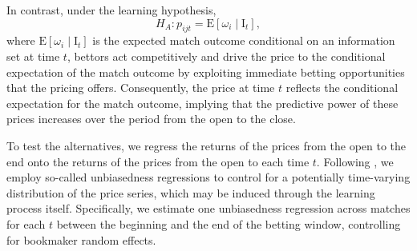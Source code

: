 \documentclass[webpdf,modern,medium]{oup-authoring-template}
\theoremstyle{thmstyleone}%
\theoremstyle{thmstyletwo}%
\theoremstyle{thmstylethree}%
\begin{document}
In contrast, under the learning hypothesis,
%
\begin{equation}
    H_A: p_{ijt} = \mathrm{E}\left[\omega_i \mid \mathrm{I}_t \right],
    \label{eq:learning_hypothesis}
\end{equation}
%
where $\mathrm{E}\left[\omega_i \mid \mathrm{I}_t\right]$ is the expected match outcome conditional on an information set at time $t$, bettors act competitively and drive the price to the conditional expectation of the match outcome by exploiting immediate betting opportunities that the pricing offers. Consequently, the price at time $t$ reflects the conditional expectation for the match outcome, implying that the predictive power of these prices increases over the period from the open to the close.

To test the alternatives, we regress the returns of the prices from the open to the end onto the returns of the prices from the open to each time $t$. Following \citet{hodrick1987, biais1999}, we employ so-called unbiasedness regressions to control for a potentially time-varying distribution of the price series, which may be induced through the learning process itself. Specifically, we estimate one unbiasedness regression across matches for each $t$ between the beginning and the end of the betting window, controlling for bookmaker random effects. %
\end{document}
